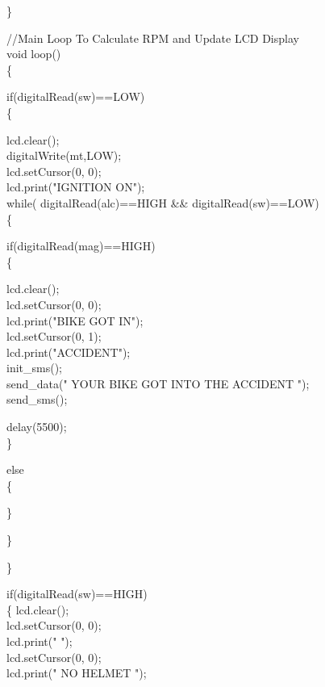 \} \vspace{.3cm}

//Main Loop To Calculate RPM and Update LCD Display\\
void loop()\\
\{

if(digitalRead(sw)==LOW)\\
\{\vspace{.3cm}

lcd.clear();\\
digitalWrite(mt,LOW);\\
lcd.setCursor(0, 0);\\
lcd.print("IGNITION ON");\\
while( digitalRead(alc)==HIGH \&\& digitalRead(sw)==LOW)\\
\{\vspace{.3cm}

if(digitalRead(mag)==HIGH)\\
\{\vspace{.3cm}

lcd.clear();\\
lcd.setCursor(0, 0);\\
lcd.print("BIKE GOT IN");\\
lcd.setCursor(0, 1);\\
lcd.print("ACCIDENT");\\
init\_sms();\\
send\_data(" YOUR BIKE GOT INTO THE ACCIDENT ");\\
send\_sms();\\
\vspace{.3cm}

delay(5500);\\
\}\vspace{.3cm}

else\\
\{\vspace{.3cm}

\}  \vspace{.3cm}

\}\vspace{.3cm}

\}\vspace{.3cm}

if(digitalRead(sw)==HIGH)\\
\{     lcd.clear();\\
lcd.setCursor(0, 0);\\
lcd.print("               ");\\
lcd.setCursor(0, 0);\\
lcd.print(" NO HELMET ");\\
\vspace{.3cm}


